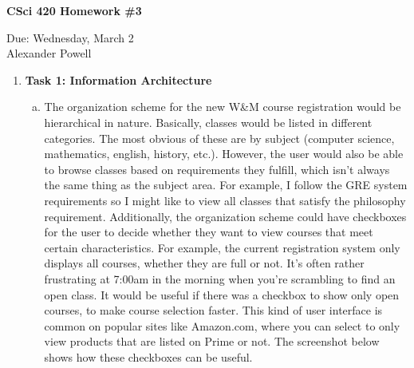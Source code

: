 \documentclass[11pt]{article}
\begin{document}
\begin{center}             %
\begin{LARGE}
{\bf CSci 420 Homework \#3}
\end{LARGE}
\vskip 0.25cm      %

Due: Wednesday, March 2\\  %
Alexander Powell
\end{center}

\begin{enumerate}[1.]

\item \textbf{Task 1: Information Architecture}
\begin{enumerate}[a)]
\item The organization scheme for the new W\&M course registration would be hierarchical in nature.  Basically, classes would be listed in different categories.  The most obvious of these are by subject (computer science, mathematics, english, history, etc.).  However, the user would also be able to browse classes based on requirements they fulfill, which isn't always the same thing as the subject area.  For example, I follow the GRE system requirements so I might like to view all classes that satisfy the philosophy requirement.  Additionally, the organization scheme could have checkboxes for the user to decide whether they want to view courses that meet certain characteristics.  For example, the current registration system only displays all courses, whether they are full or not.  It's often rather frustrating at 7:00am in the morning when you're scrambling to find an open class.  It would be useful if there was a checkbox to show only open courses, to make course selection faster.  This kind of user interface is common on popular sites like Amazon.com, where you can select to only view products that are listed on Prime or not.  The screenshot below shows how these checkboxes can be useful.  



\end{enumerate}
\end{enumerate}
\end{document}
